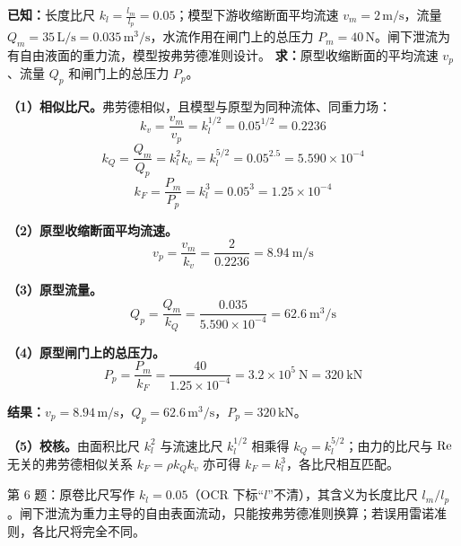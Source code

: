 
\begin{jie}
\textbf{已知：}长度比尺 $k_l=\frac{l_m}{l_p}=0.05$；模型下游收缩断面平均流速 $v_m=2\,\mathrm{m/s}$，流量 $Q_m=35\,\mathrm{L/s}=0.035\,\mathrm{m^3/s}$，水流作用在闸门上的总压力 $P_m=40\,\mathrm{N}$。闸下泄流为有自由液面的重力流，模型按弗劳德准则设计。
\textbf{求：}原型收缩断面的平均流速 $v_p$、流量 $Q_p$ 和闸门上的总压力 $P_p$。

\textbf{（1）相似比尺。}弗劳德相似，且模型与原型为同种流体、同重力场：
\[
k_v=\frac{v_m}{v_p}=k_l^{1/2}=0.05^{1/2}=0.2236
\]
\[
k_Q=\frac{Q_m}{Q_p}=k_l^2k_v=k_l^{5/2}=0.05^{2.5}=5.590\times10^{-4}
\]
\[
k_F=\frac{P_m}{P_p}=k_l^3=0.05^3=1.25\times10^{-4}
\]

\textbf{（2）原型收缩断面平均流速。}
\[
v_p=\frac{v_m}{k_v}=\frac{2}{0.2236}=8.94\ \mathrm{m/s}
\]

\textbf{（3）原型流量。}
\[
Q_p=\frac{Q_m}{k_Q}=\frac{0.035}{5.590\times10^{-4}}=62.6\ \mathrm{m^3/s}
\]

\textbf{（4）原型闸门上的总压力。}
\[
P_p=\frac{P_m}{k_F}=\frac{40}{1.25\times10^{-4}}=3.2\times10^5\ \mathrm{N}=320\ \mathrm{kN}
\]

\textbf{结果：}$v_p=8.94\,\mathrm{m/s}$，$Q_p=62.6\,\mathrm{m^3/s}$，$P_p=320\,\mathrm{kN}$。

\textbf{（5）校核。}由面积比尺 $k_l^2$ 与流速比尺 $k_l^{1/2}$ 相乘得 $k_Q=k_l^{5/2}$；由力的比尺与 $\mathrm{Re}$ 无关的弗劳德相似关系 $k_F=\rho k_Qk_v$ 亦可得 $k_F=k_l^3$，各比尺相互匹配。
\end{jie}

\begin{tishi}
第 6 题：原卷比尺写作 $k_l=0.05$（OCR 下标“$l$”不清），其含义为长度比尺 $l_m/l_p$。闸下泄流为重力主导的自由表面流动，只能按弗劳德准则换算；若误用雷诺准则，各比尺将完全不同。
\end{tishi}
